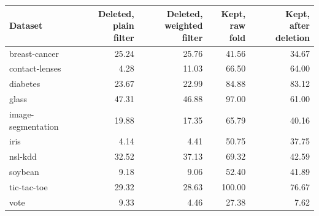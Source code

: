 \begin{tabular}{lrrrr}
\toprule
Dataset & \makecell{Deleted,\\plain filter} & \makecell{Deleted,\\weighted filter} & \makecell{Kept,\\raw fold} & \makecell{Kept,\\after deletion} \\
\midrule
breast-cancer & 25.24 & 25.76 & 41.56 & 34.67 \\
contact-lenses & 4.28 & 11.03 & 66.50 & 64.00 \\
diabetes & 23.67 & 22.99 & 84.88 & 83.12 \\
glass & 47.31 & 46.88 & 97.00 & 61.00 \\
image-segmentation & 19.88 & 17.35 & 65.79 & 40.16 \\
iris & 4.14 & 4.41 & 50.75 & 37.75 \\
nsl-kdd & 32.52 & 37.13 & 69.32 & 42.59 \\
soybean & 9.18 & 9.06 & 52.40 & 41.89 \\
tic-tac-toe & 29.32 & 28.63 & 100.00 & 76.67 \\
vote & 9.33 & 4.46 & 27.38 & 7.62 \\
\bottomrule
\end{tabular}
